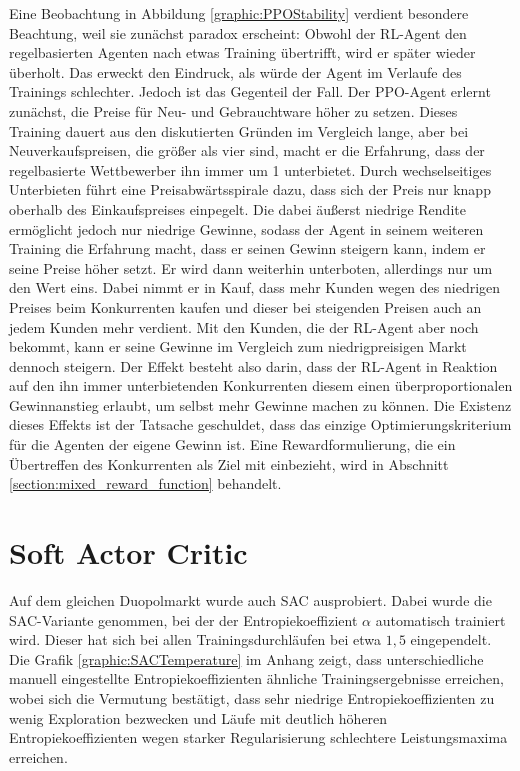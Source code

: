 Eine Beobachtung in Abbildung \ref{graphic:PPOStability} verdient besondere Beachtung, weil sie zunächst paradox erscheint:
Obwohl der RL-Agent den regelbasierten Agenten nach etwas Training übertrifft, wird er später wieder überholt.
Das erweckt den Eindruck, als würde der Agent im Verlaufe des Trainings schlechter.
Jedoch ist das Gegenteil der Fall.
Der PPO-Agent erlernt zunächst, die Preise für Neu- und Gebrauchtware höher zu setzen.
Dieses Training dauert aus den diskutierten Gründen im Vergleich lange, aber bei Neuverkaufspreisen, die größer als vier sind, macht er die Erfahrung, dass der regelbasierte Wettbewerber ihn immer um 1 unterbietet.
Durch wechselseitiges Unterbieten führt eine Preisabwärtsspirale dazu, dass sich der Preis nur knapp oberhalb des Einkaufspreises einpegelt.
Die dabei äußerst niedrige Rendite ermöglicht jedoch nur niedrige Gewinne, sodass der Agent in seinem weiteren Training die Erfahrung macht, dass er seinen Gewinn steigern kann, indem er seine Preise höher setzt.
Er wird dann weiterhin unterboten, allerdings nur um den Wert eins.
Dabei nimmt er in Kauf, dass mehr Kunden wegen des niedrigen Preises beim Konkurrenten kaufen und dieser bei steigenden Preisen auch an jedem Kunden mehr verdient.
Mit den Kunden, die der RL-Agent aber noch bekommt, kann er seine Gewinne im Vergleich zum niedrigpreisigen Markt dennoch steigern.
Der Effekt besteht also darin, dass der RL-Agent in Reaktion auf den ihn immer unterbietenden Konkurrenten diesem einen überproportionalen Gewinnanstieg erlaubt, um selbst mehr Gewinne machen zu können.
Die Existenz dieses Effekts ist der Tatsache geschuldet, dass das einzige Optimierungskriterium für die Agenten der eigene Gewinn ist.
Eine Rewardformulierung, die ein Übertreffen des Konkurrenten als Ziel mit einbezieht, wird in Abschnitt \ref{section:mixed_reward_function} behandelt.

\section{Soft Actor Critic}
\label{section:main_sac}
Auf dem gleichen Duopolmarkt wurde auch SAC ausprobiert.
Dabei wurde die SAC-Variante genommen, bei der der Entropiekoeffizient $\alpha$ automatisch trainiert wird.
Dieser hat sich bei allen Trainingsdurchläufen bei etwa $1,5$ eingependelt.
Die Grafik \ref{graphic:SACTemperature} im Anhang zeigt, dass unterschiedliche manuell eingestellte Entropiekoeffizienten ähnliche Trainingsergebnisse erreichen, wobei sich die Vermutung bestätigt, dass sehr niedrige Entropiekoeffizienten zu wenig Exploration bezwecken und Läufe mit deutlich höheren Entropiekoeffizienten wegen starker Regularisierung schlechtere Leistungsmaxima erreichen.

